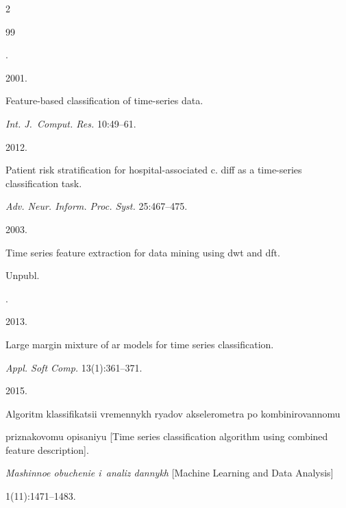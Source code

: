 \begin{multicols}{2}
{{\begin{thebibliography}{99}


.


2001.


Feature-based classification of time-series data.


\textit{Int. J.~Comput. Res.} 10:49--61.









2012.


Patient risk stratification for hospital-associated c. diff as a time-series classification task.


\textit{Adv. Neur. Inform. Proc. Syst.} 25:467--475.









2003.


Time series feature extraction for data mining using dwt and dft.


Unpubl.







.


2013.


 Large margin mixture of ar models for time series classification.


\textit{Appl. Soft Comp.} 13(1):361--371.









2015.


Algoritm klassifikatsii vremennykh ryadov akselerometra po kombinirovannomu 


priznakovomu opisaniyu [Time series classification algorithm using combined feature description].


\textit{Mashinnoe obuchenie i~analiz dannykh} [Machine Learning and Data Analysis]


 1(11):1471--1483.






\end{thebibliography}}}
\end{multicols}
